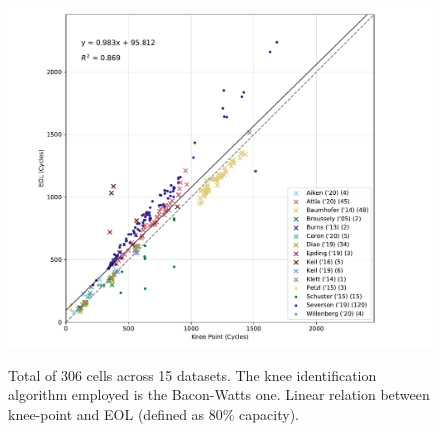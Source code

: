 \documentclass[journal=jpcl, manuscript=article, layout=onecolumn]{achemso}
\begin{document}
\begin{figure}[ht]
\centering
\includegraphics[scale=1.0]{figures/AcrossDatasetsknee-to-EOL}
  \label{fig:kneepoint2EOL}
\caption{Total of 306 cells across 15 datasets. The knee identification algorithm employed is the Bacon-Watts one. Linear relation between knee-point and EOL (defined as 80\% capacity).}
\label{fig:knees2EOL}
\end{figure}
\end{document}
